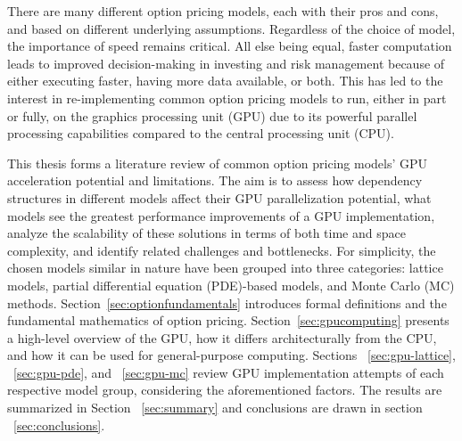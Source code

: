 \documentclass[english,12pt,a4paper,pdftex,sci,utf8]{aaltothesis}
\begin{document}
There are many different option pricing models, each with their pros and cons, and based on different underlying assumptions. Regardless of the choice of model, the importance of speed remains critical. All else being equal, faster computation leads to improved decision-making in investing and risk management because of either executing faster, having more data available, or both. This has led to the interest in re-implementing common option pricing models to run, either in part or fully, on the graphics processing unit (GPU) due to its powerful parallel processing capabilities compared to the central processing unit (CPU).

This thesis forms a literature review of common option pricing models' GPU acceleration potential and limitations. The aim is to assess how dependency structures in different models affect their GPU parallelization potential, what models see the greatest performance improvements of a GPU implementation, analyze the scalability of these solutions in terms of both time and space complexity, and identify related challenges and bottlenecks. For simplicity, the chosen models similar in nature have been grouped into three categories: lattice models, partial differential equation (PDE)-based models, and Monte Carlo (MC) methods. Section~\ref{sec:optionfundamentals} introduces formal definitions and the fundamental mathematics of option pricing. Section~\ref{sec:gpucomputing} presents a high-level overview of the GPU, how it differs architecturally from the CPU, and how it can be used for general-purpose computing. Sections ~\ref{sec:gpu-lattice}, ~\ref{sec:gpu-pde}, and ~\ref{sec:gpu-mc} review GPU implementation attempts of each respective model group, considering the aforementioned factors. The results are summarized in Section ~\ref{sec:summary} and conclusions are drawn in section ~\ref{sec:conclusions}.
\end{document}
